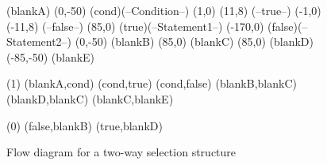 




\begin {figure}

\Draw

\FcNode(blankA)		%
\Move(0,-50)
\DiamondNode(cond)(--Condition--)
{ \MoveToExit(1,0) \Move(11,8) \Text(--true--) }
{ \MoveToExit(-1,0) \Move(-11,8) \Text(--false--) }
\Move(85,0) \RectNode(true)(--Statement1--)
\Move(-170,0) \RectNode(false)(--Statement2--)
\Move(0,-50)
\FcNode(blankB)
\Move(85,0)
\FcNode(blankC)
\Move(85,0)
\FcNode(blankD)
\Move(-85,-50)
\FcNode(blankE)


\ArrowHeads(1)
\Edge (blankA,cond)
\Edge (cond,true)
\Edge (cond,false)
\Edge (blankB,blankC)
\Edge (blankD,blankC)
\Edge (blankC,blankE)

\ArrowHeads(0)
\Edge (false,blankB)
\Edge (true,blankD)



\EndDraw


\caption {Flow diagram for a two-way selection structure}

\label {fig:twoWay}

\end {figure}


